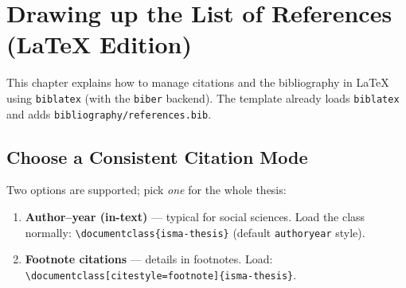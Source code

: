 



\chapter{Drawing up the List of References (LaTeX Edition)}

This chapter explains how to manage citations and the bibliography in \LaTeX{} using \texttt{biblatex} (with the \texttt{biber} backend). The template already loads \texttt{biblatex} and adds \texttt{bibliography/references.bib}.

\section{Choose a Consistent Citation Mode}
Two options are supported; pick \emph{one} for the whole thesis:
\begin{enumerate}
  \item \textbf{Author–year (in-text)} — typical for social sciences. Load the class normally:
  \verb|\documentclass{isma-thesis}| (default \texttt{authoryear} style).
  \item \textbf{Footnote citations} — details in footnotes. Load:
  \verb|\documentclass[citestyle=footnote]{isma-thesis}|.
\end{enumerate}

